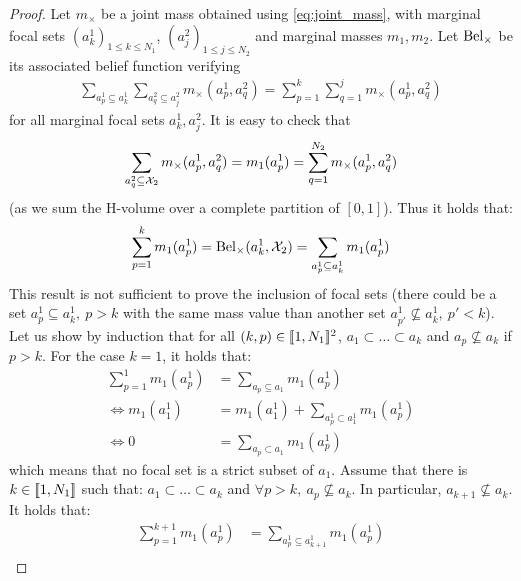 \begin{proof}
    Let $m_\times$ be a joint mass obtained using \eqref{eq:joint_mass}, with marginal focal sets $(a^1_k)_{1\leqslant k\leqslant N_1}$, $(a^2_j)_{1\leqslant j\leqslant N_2}$ and marginal masses $m_1,m_2$. 
    Let $\mathrm{Bel}_\times$ be its associated belief function verifying
    \begin{align*}
        \sum_{a^1_p\subseteq a^1_k}\sum_{a^2_q\subseteq a_j^2}m_\times(a^1_p, a^2_q) = \sum_{p=1}^k\sum_{q=1}^j m_\times(a^1_p, a^2_q)
    \end{align*}
    for all marginal focal sets $a^1_k,a^2_j$. It is easy to check that
    \begin{align*}
        \sum_{a^2_q\subseteq \mathcal{X}_2}m_\times(a^1_p, a^2_q)=m_1(a^1_p)=\sum_{q=1}^{N_2}m_\times(a^1_p, a^2_q)    
    \end{align*}
    (as we sum the H-volume over a complete partition of $[0,1]$). Thus it holds that:
    \begin{align*}
        \sum_{p=1}^k m_1(a^1_p) = \mathrm{Bel}_\times(a^1_k,\mathcal{X}_2)=\sum_{a^1_p\subseteq a_k^1}m_1(a^1_p)
    \end{align*}
    This result is not sufficient to prove the inclusion of focal sets (there could be a set $a^1_p\subseteq a^1_k,~p>k$ with the same mass value than another set $a^1_{p'}\not\subseteq a^1_k,~p' < k$). Let us show by induction that for all $(k, p)\in[\![1,N_1]\!]^2$, $a_1\subset\dots\subset a_k$ and $a_p\not\subseteq a_k$ if $p>k$.
    For the case $k=1$, it holds that:
    \begin{align*}
        \sum_{p=1}^1m_1(a^1_p) &= \sum_{a_p\subseteq a_1}m_1(a^1_p)\\
        \Leftrightarrow m_1(a^1_1) &= m_1(a^1_1) + \sum_{a^1_p\subset a^1_1}m_1(a^1_p)\\
        \Leftrightarrow 0 &=\sum_{a_p\subset a_1}m_1(a^1_p)
    \end{align*}
    which means that no focal set is a strict subset of $a_1$.
    Assume that there is $k\in[\![1,N_1]\!]$ such that: $a_1\subset\dots\subset a_k$ and $\forall p>k,~a_p\not\subseteq a_k$. In particular, $a_{k+1}\not\subseteq a_k$. It holds that:
    \begin{align*}
        \sum_{p=1}^{k+1}m_1(a^1_p) &= \sum_{a^1_p\subseteq a^1_{k+1}}m_1(a^1_p)\\

\end{align*}
\end{proof}
